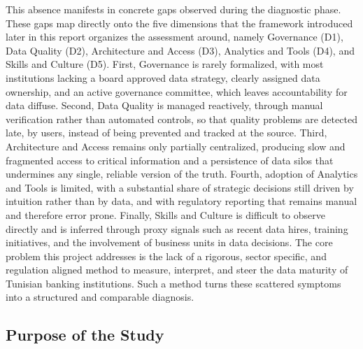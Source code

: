 This absence manifests in concrete gaps observed during the diagnostic phase. These gaps map directly onto the five dimensions that the framework introduced later in this report organizes the assessment around, namely Governance (D1), Data Quality (D2), Architecture and Access (D3), Analytics and Tools (D4), and Skills and Culture (D5). First, Governance is rarely formalized, with most institutions lacking a board approved data strategy, clearly assigned data ownership, and an active governance committee, which leaves accountability for data diffuse. Second, Data Quality is managed reactively, through manual verification rather than automated controls, so that quality problems are detected late, by users, instead of being prevented and tracked at the source. Third, Architecture and Access remains only partially centralized, producing slow and fragmented access to critical information and a persistence of data silos that undermines any single, reliable version of the truth. Fourth, adoption of Analytics and Tools is limited, with a substantial share of strategic decisions still driven by intuition rather than by data, and with regulatory reporting that remains manual and therefore error prone. Finally, Skills and Culture is difficult to observe directly and is inferred through proxy signals such as recent data hires, training initiatives, and the involvement of business units in data decisions. The core problem this project addresses is the lack of a rigorous, sector specific, and regulation aligned method to measure, interpret, and steer the data maturity of Tunisian banking institutions. Such a method turns these scattered symptoms into a structured and comparable diagnosis.

\subsection{Purpose of the Study}

